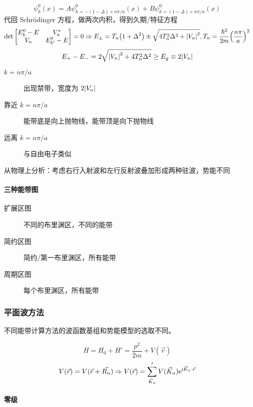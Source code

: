 \[ \psi_k^0(x) = A \psi_{k = - (1 - \Delta) \times n \pi / a}^0(x) + B \psi_{k = (1 - \Delta) \times n \pi / a}^0(x) \]
代回 Schrödinger 方程，做两次内积，得到久期/特征方程
\[ \det \mqty[E_k^0 - E & V_n^* \\ V_n & E_{k'}^0 - E] = 0 \Rightarrow E_{\pm} = T_n \qty(1 + \Delta^2) \pm \sqrt{4 T_n^2 \Delta^2 + \qty|V_n|^2}, T_n = \frac{\hbar^2}{2 m} \qty(\frac{n \pi}{a})^2 \]
\[ E_+ - E_- = 2 \sqrt{\qty|V_n|^2 + 4 T_n^2 \Delta^2} \geq E_g \equiv 2 \qty|V_n| \]
\begin{description}
    \item[$k = n \pi / a$] 出现禁带，宽度为 $2 \qty|V_n|$
    \item[靠近 $k = n \pi / a$] 能带底是向上抛物线，能带顶是向下抛物线
    \item[远离 $k = n \pi / a$] 与自由电子类似
\end{description}
从物理上分析：考虑右行入射波和左行反射波叠加形成两种驻波，势能不同

\paragraph{三种能带图}

\begin{description}
    \item[扩展区图] 不同的布里渊区，不同的能带
    \item[简约区图] 简约/第一布里渊区，所有能带
    \item[周期区图] 每个布里渊区，所有能带
\end{description}

\subsubsection{平面波方法}

不同能带计算方法的波函数基组和势能模型的选取不同。

\[ H = H_0 + H' = \frac{p^2}{2 m} + V(\vec{r}) \]
\[ V(\vec{r}) = V(\vec{r} + \vec{R_n}) \Rightarrow V(\vec{r}) = \sum_{\vec{K}_n}' V(\vec{K}_n) \mathrm{e}^{\mathrm{i} \vec{K}_n \cdot \vec{r}} \]

\paragraph{零级}

